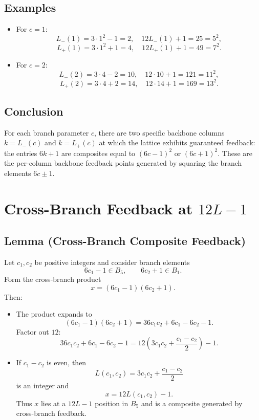 \documentclass[12pt]{article}
\begin{document}
\subsection*{Examples}
\begin{itemize}
\item For $c=1$:
\[
L_-(1) = 3\cdot 1^2 - 1 = 2,\quad 12L_-(1)+1 = 25 = 5^2,
\]
\[
L_+(1) = 3\cdot 1^2 + 1 = 4,\quad 12L_+(1)+1 = 49 = 7^2.
\]

\item For $c=2$:
\[
L_-(2) = 3\cdot 4 - 2 = 10,\quad 12\cdot 10+1 = 121 = 11^2,
\]
\[
L_+(2) = 3\cdot 4 + 2 = 14,\quad 12\cdot 14+1 = 169 = 13^2.
\]
\end{itemize}

\subsection*{Conclusion}
For each branch parameter $c$, there are two specific backbone columns
$k = L_-(c)$ and $k = L_+(c)$ at which the lattice exhibits guaranteed
feedback: the entries $6k+1$ are composites equal to $(6c-1)^2$ or
$(6c+1)^2$. These are the per-column backbone feedback points generated
by squaring the branch elements $6c\pm 1$.

\section{Cross-Branch Feedback at $12L-1$}

\subsection*{Lemma (Cross-Branch Composite Feedback)}
Let $c_1,c_2$ be positive integers and consider branch elements
\[
6c_1 - 1 \in B_5, \qquad 6c_2 + 1 \in B_1.
\]
Form the cross-branch product
\[
x = (6c_1 - 1)(6c_2 + 1).
\]
Then:

\begin{itemize}
\item[(1)] The product expands to
\[
(6c_1 - 1)(6c_2 + 1)
= 36c_1c_2 + 6c_1 - 6c_2 - 1.
\]
Factor out $12$:
\[
36c_1c_2 + 6c_1 - 6c_2 - 1
= 12\left(3c_1c_2 + \frac{c_1 - c_2}{2}\right) - 1.
\]

\item[(2)] If $c_1 - c_2$ is even, then
\[
L(c_1,c_2) = 3c_1c_2 + \frac{c_1 - c_2}{2}
\]
is an integer and
\[
x = 12L(c_1,c_2) - 1.
\]
Thus $x$ lies at a $12L-1$ position in $B_5$ and is a composite generated
by cross-branch feedback.
\end{itemize}
\end{document}
